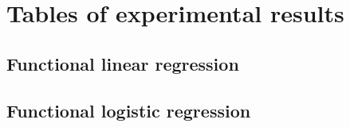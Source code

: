 %
%

\chapter{Tables of experimental results}\label{ch:tables}


\section*{Functional linear regression}

\section*{Functional logistic regression}
